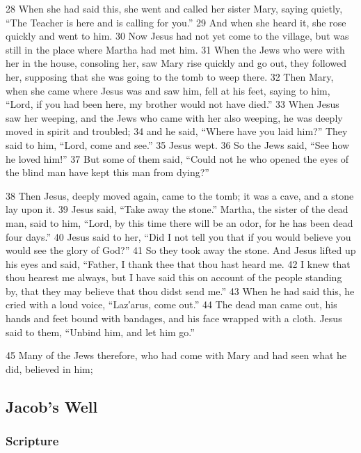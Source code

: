 \documentclass[letterpaper]{report}
\begin{document}
\begin{multicols}{2}
28 When she had said this, she went and called her sister Mary, saying quietly, “The Teacher is here and is calling for you.” 29 And when she heard it, she rose quickly and went to him. 30 Now Jesus had not yet come to the village, but was still in the place where Martha had met him. 31 When the Jews who were with her in the house, consoling her, saw Mary rise quickly and go out, they followed her, supposing that she was going to the tomb to weep there. 32 Then Mary, when she came where Jesus was and saw him, fell at his feet, saying to him, “Lord, if you had been here, my brother would not have died.” 33 When Jesus saw her weeping, and the Jews who came with her also weeping, he was deeply moved in spirit and troubled; 34 and he said, “Where have you laid him?” They said to him, “Lord, come and see.” 35 Jesus wept. 36 So the Jews said, “See how he loved him!” 37 But some of them said, “Could not he who opened the eyes of the blind man have kept this man from dying?”

38 Then Jesus, deeply moved again, came to the tomb; it was a cave, and a stone lay upon it. 39 Jesus said, “Take away the stone.” Martha, the sister of the dead man, said to him, “Lord, by this time there will be an odor, for he has been dead four days.” 40 Jesus said to her, “Did I not tell you that if you would believe you would see the glory of God?” 41 So they took away the stone. And Jesus lifted up his eyes and said, “Father, I thank thee that thou hast heard me. 42 I knew that thou hearest me always, but I have said this on account of the people standing by, that they may believe that thou didst send me.” 43 When he had said this, he cried with a loud voice, “Laz′arus, come out.” 44 The dead man came out, his hands and feet bound with bandages, and his face wrapped with a cloth. Jesus said to them, “Unbind him, and let him go.”

45 Many of the Jews therefore, who had come with Mary and had seen what he did, believed in him;
\end{multicols}

\clearpage
\subsection{Jacob's Well}
\begin{multicols}{2}
	\mbox{}
\end{multicols}
\subsubsection{Scripture}
\end{document}

